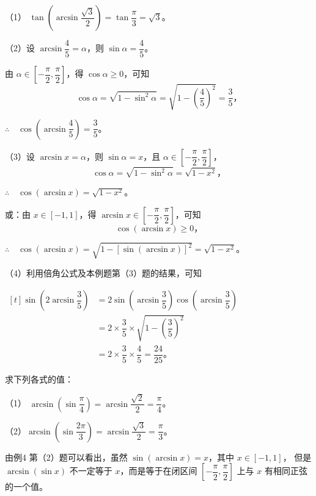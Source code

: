 \jie （1） $\tan\left( \arcsin \dfrac{\sqrt{3}}{2} \right) = \tan\dfrac{\pi}{3} = \sqrt{3}$。\jiange

（2）设 $\arcsin \dfrac{4}{5} = \alpha$，则 $\sin\alpha = \dfrac{4}{5}$。\jiange

由 $\alpha \in \left[ -\dfrac{\pi}{2}, \dfrac{\pi}{2} \right]$，得 $\cos\alpha \geqslant 0$，可知
$$\cos\alpha = \sqrt{1 - \sin^2\alpha} = \sqrt{1 - \left( \dfrac{4}{5} \right)^2} = \dfrac{3}{5} \text{，}$$

$\therefore \quad \cos\left( \arcsin \dfrac{4}{5} \right) = \dfrac{3}{5}$。

（3）设 $\arcsin x = \alpha$，则 $\sin\alpha = x$，且 $\alpha \in \left[ -\dfrac{\pi}{2}, \dfrac{\pi}{2} \right]$，\jiange
$$\cos\alpha = \sqrt{1 - \sin^2\alpha} = \sqrt{1 - x^2} \text{，}$$

$\therefore \quad \cos(\arcsin x) = \sqrt{1 - x^2}$。

或：由 $x \in [-1, 1]$，得 $\arcsin x \in \left[ -\dfrac{\pi}{2}, \dfrac{\pi}{2} \right]$，可知 \jiange
$$\cos(\arcsin x) \geqslant 0 \text{，}$$

$\therefore \quad \cos(\arcsin x) = \sqrt{1 - [\sin( \arcsin x )]^2} = \sqrt{1 - x^2}$。

（4）利用倍角公式及本例题第（3）题的结果，可知 \jiange

\qquad $\begin{aligned}[t]
    \sin\left( 2\arcsin \dfrac{3}{5} \right) &= 2\sin\left( \arcsin \dfrac{3}{5} \right) \cos\left( \arcsin \dfrac{3}{5} \right) \\
    &= 2 \times \dfrac{3}{5} \times \sqrt{1 - \left( \dfrac{3}{5} \right)^2} \\
    &= 2 \times \dfrac{3}{5} \times \dfrac{4}{5} = \dfrac{24}{25} \text{。}
\end{aligned}$ \jiange

\liti 求下列各式的值：
\begin{xiaoxiaotis}


\end{xiaoxiaotis}

\jie （1） $\arcsin\left( \sin\dfrac{\pi}{4} \right) = \arcsin\dfrac{\sqrt{2}}{2} = \dfrac{\pi}{4}$。\jiange

（2）$\arcsin\left( \sin\dfrac{2\pi}{3} \right) = \arcsin\dfrac{\sqrt{3}}{2} = \dfrac{\pi}{3}$。\jiange

由例4 第（2）题可以看出，虽然 $\sin(\arcsin x) = x$，其中 $x \in [-1, 1]$，\jiange
但是 $\arcsin(\sin x)$ 不一定等于 $x$，而是等于在闭区间
$\left[ -\dfrac{\pi}{2}, \dfrac{\pi}{2} \right]$ \jiange
上与 $x$ 有相同正弦的一个值。

